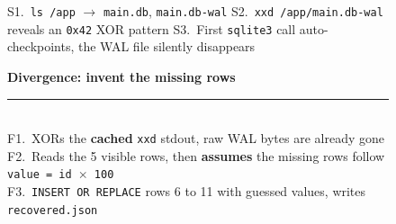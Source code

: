 \begin{figure}[t]
    \centering
    \scriptsize
    \begin{tcolorbox}[colback=black!3, colframe=black!50, boxrule=0.5pt,
                      left=4pt, right=4pt, top=3pt, bottom=3pt,
                      colbacktitle=black!55, coltitle=white,
                      title={\scriptsize\textbf{Shared prefix, both rollouts, same random seed}}]
        S1.~\texttt{ls /app} $\rightarrow$ \texttt{main.db}, \texttt{main.db-wal} \quad\textbar\quad
        S2.~\texttt{xxd /app/main.db-wal} reveals an \texttt{0x42} XOR pattern \quad\textbar\quad
        S3.~First \texttt{sqlite3} call auto-checkpoints, the WAL file silently disappears
    \end{tcolorbox}
    \vspace{2pt}
    \begin{tcbraster}[raster columns=3,
                      raster equal height,
                      raster column skip=4pt,
                      raster row skip=0pt,
                      raster left skip=0pt,
                      raster right skip=0pt,
                      boxrule=0.6pt,
                      left=4pt,right=4pt,top=3pt,bottom=3pt,
                      coltitle=white]
        \begin{tcolorbox}[colback=aheSky!18,colframe=aheNavy,colbacktitle=aheNavy,
                          title={\scriptsize\textbf{Before \texttt{chg-1}, NexAU\textsubscript{0} seed, iteration 1, reward 0.0}}]
            \textbf{\textcolor{aheNavy}{Divergence: invent the missing rows}} \\
            \rule{\linewidth}{0.3pt}\\[1pt]
            F1.~XORs the \textbf{cached} \texttt{xxd} stdout, raw WAL bytes are already gone \\[2pt]
            F2.~Reads the 5 visible rows, then \textbf{assumes} the missing rows follow \texttt{value = id $\times$ 100} \\[2pt]
            F3.~\texttt{INSERT OR REPLACE} rows 6 to 11 with guessed values, writes \texttt{recovered.json} \\[2pt]

\end{tcolorbox}
\end{tcbraster}
\end{figure}
